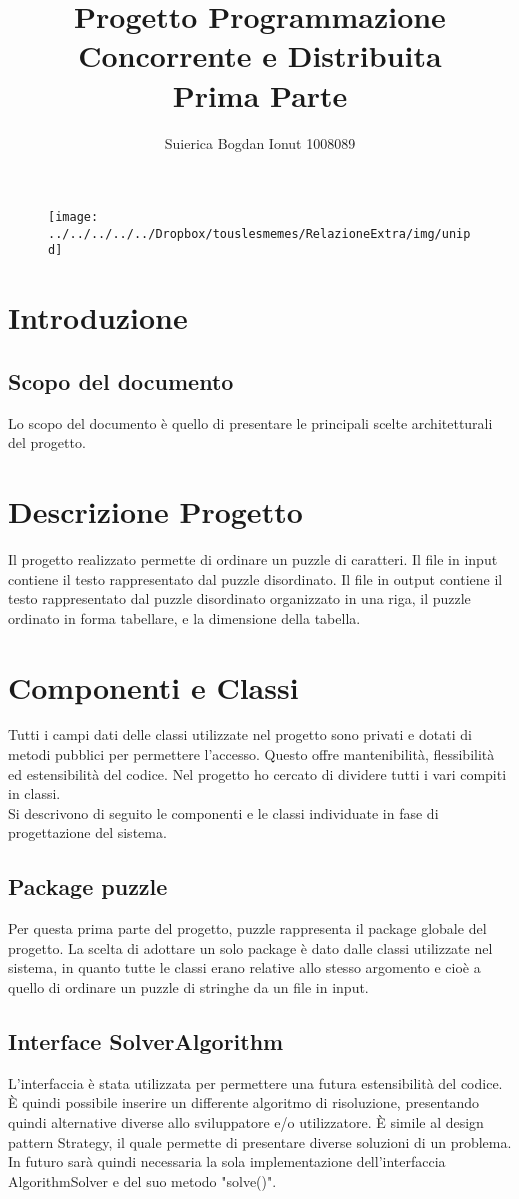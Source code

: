 \documentclass[11pt]{article}
\title{Progetto Programmazione Concorrente e Distribuita\\Prima Parte}
\author{Suierica Bogdan Ionut 1008089}
\begin{document}
	


\maketitle
	\begin{figure}[h]
		\centering
		\texttt{[image: ../../../../../Dropbox/touslesmemes/RelazioneExtra/img/unipd]}
		\label{fig:unipd}
	\end{figure}
\newpage
\section{Introduzione}
\subsection{Scopo del documento}
Lo scopo del documento è quello di presentare le principali scelte architetturali del progetto.
\section{Descrizione Progetto}
Il progetto realizzato permette di ordinare un puzzle di caratteri.  Il file in input contiene il testo rappresentato dal puzzle disordinato. Il file in output contiene il testo rappresentato dal puzzle disordinato organizzato in una riga, il puzzle ordinato in forma tabellare, e la dimensione della tabella. 
\section{Componenti e Classi}
Tutti i campi dati delle classi utilizzate nel progetto sono privati e dotati di metodi pubblici per permettere l'accesso. Questo offre mantenibilità, flessibilità ed estensibilità del codice. Nel progetto ho cercato di dividere tutti i vari compiti in classi.\\
Si descrivono di seguito le componenti e le classi individuate in fase di progettazione del sistema.
\subsection{Package puzzle}
Per questa prima parte del progetto, puzzle rappresenta il package globale del progetto. La scelta di adottare un solo package è dato dalle classi utilizzate nel sistema, in quanto tutte le classi erano relative allo stesso argomento e cioè a quello di ordinare un puzzle di stringhe da un file in input.
\subsection{Interface SolverAlgorithm}
L’interfaccia è stata utilizzata per permettere una futura estensibilità del codice. È quindi possibile inserire un differente algoritmo di risoluzione, presentando quindi alternative diverse allo sviluppatore e/o utilizzatore. È simile al design pattern Strategy, il quale permette di presentare diverse soluzioni di un problema. In futuro sarà quindi necessaria la sola implementazione dell’interfaccia AlgorithmSolver e del suo metodo "solve()".
\end{document}
